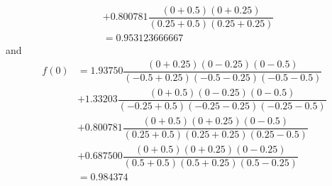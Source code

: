 \documentclass{article}
\begin{document}
\begin{answer}
\begin{align*}
                     &+ 0.800781 \dfrac{(0 + 0.5)(0 + 0.25)}{(0.25 + 0.5)(0.25 + 0.25)} \\
                     &= 0.953123666667
            \end{align*}
        and
            \begin{align*}
                f(0) &= 1.93750 \dfrac{(0 + 0.25)(0 - 0.25)(0 - 0.5)}{(-0.5 + 0.25)(-0.5 - 0.25)(-0.5 - 0.5)} \\ 
                     &+ 1.33203 \dfrac{(0 + 0.5)(0 - 0.25)(0 - 0.5)}{(-0.25 + 0.5)(-0.25 - 0.25)(-0.25 - 0.5)} \\ 
                     &+ 0.800781 \dfrac{(0 + 0.5)(0 + 0.25)(0 - 0.5)}{(0.25 + 0.5)(0.25 + 0.25)(0.25 - 0.5)} \\
                     &+ 0.687500 \dfrac{(0 + 0.5)(0 + 0.25)(0 - 0.25)}{(0.5 + 0.5)(0.5 + 0.25)(0.5 - 0.25)} \\
                     &= 0.984374
            \end{align*}
    \end{answer}
\end{document}
